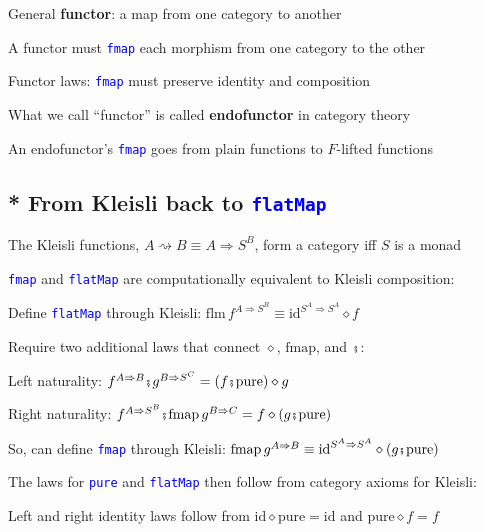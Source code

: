 General \textbf{functor}: a map from one category to another

A functor must \texttt{\textcolor{blue}{\footnotesize{}fmap}} each
morphism from one category to the other

Functor laws: \texttt{\textcolor{blue}{\footnotesize{}fmap}} must
preserve identity and composition

What we call ``functor'' is called \textbf{endofunctor} in category
theory

An endofunctor's \texttt{\textcolor{blue}{\footnotesize{}fmap}} goes
from plain functions to $F$-lifted functions


\subsection{{*} From Kleisli back to \texttt{\textcolor{blue}{\footnotesize{}flatMap}} }

The Kleisli functions, $A\rightsquigarrow B\equiv A\Rightarrow S^{B}$,
form a category iff $S$ is a monad 

\texttt{\textcolor{blue}{\footnotesize{}fmap}} and \texttt{\textcolor{blue}{\footnotesize{}flatMap}}
are computationally equivalent to Kleisli composition:

Define \texttt{\textcolor{blue}{\footnotesize{}flatMap}} through Kleisli:{\small{}
$\text{flm}\,f^{A\Rightarrow S^{B}}\equiv\text{id}^{S^{A}\Rightarrow S^{A}}\diamond f$}{\small\par}

Require two additional laws that connect $\diamond$, $\text{fmap}$,
and $\bef$:

Left naturality: {\small{}$f^{A\Rightarrow B}\bef g^{B\Rightarrow S^{C}}=\left(f\bef\text{pure}\right)\diamond g$}{\small\par}

Right naturality: {\small{}$f^{A\Rightarrow S^{B}}\bef\text{fmap}\,g^{B\Rightarrow C}=f\diamond\left(g\bef\text{pure}\right)$}{\small\par}

So, can define \texttt{\textcolor{blue}{\footnotesize{}fmap}} through
Kleisli: $\text{fmap}\,g^{A\Rightarrow B}\equiv\text{id}^{S^{A}\Rightarrow S^{A}}\diamond\left(g\bef\text{pure}\right)$

The laws for \texttt{\textcolor{blue}{\footnotesize{}pure}} and \texttt{\textcolor{blue}{\footnotesize{}flatMap}}
then follow from category axioms for Kleisli:

Left and right identity laws follow from $\text{id}\diamond\text{pure}=\text{id}$
and $\text{pure}\diamond f=f$ 

